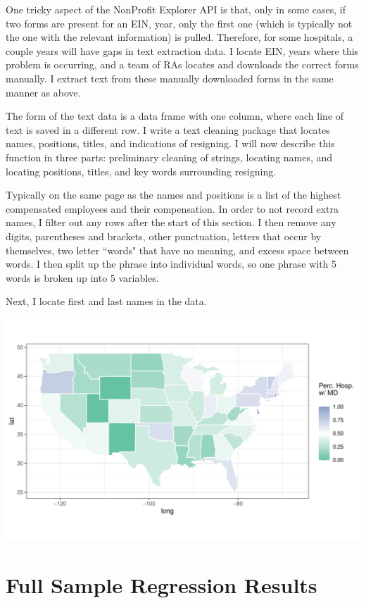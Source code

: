 \documentclass[12pt]{article}
\begin{document}
One tricky aspect of the NonProfit Explorer API is that, only in some cases, if two forms are present for an EIN, year, only the first one (which is typically not the one with the relevant information) is pulled. Therefore, for some hospitals, a couple years will have gaps in text extraction data. I locate EIN, years where this problem is occurring, and a team of RAs locates and downloads the correct forms manually. I extract text from these manually downloaded forms in the same manner as above. 

The form of the text data is a data frame with one column, where each line of text is saved in a different row. I write a text cleaning package that locates names, positions, titles, and indications of resigning. I will now describe this function in three parts: preliminary cleaning of strings, locating names, and locating positions, titles, and key words surrounding resigning. 

Typically on the same page as the names and positions is a list of the highest compensated employees and their compensation. In order to not record extra names, I filter out any rows after the start of this section. I then remove any digits, parentheses and brackets, other punctuation, letters that occur by themselves, two letter ``words" that have no meaning, and excess space between words. I then split up the phrase into individual words, so one phrase with 5 words is broken up into 5 variables. 

Next, I locate first and last names in the data. 

\includegraphics[width=\textwidth]{Objects/has_doc_avg_map.pdf}


\section{Full Sample Regression Results}
\end{document}
